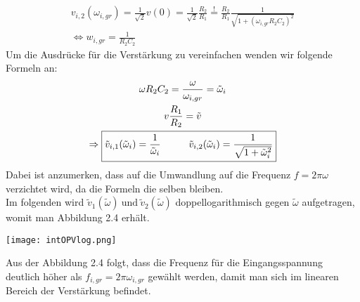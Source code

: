 \begin{gather}
    v_{i,2}(\omega_{i,gr}) = \frac{1}{\sqrt{2}} v(0) = \frac{1}{\sqrt{2}} \frac{R_2}{R_1} \overset{!}{=} \frac{R_2}{R_1} \frac{1}{\sqrt{1+(\omega_{i,gr} R_2 C_2)^2}}\\
    \Leftrightarrow \boxed{w_{i,gr} = \frac{1}{R_2 C_2}}
\end{gather}
Um die Ausdrücke für die Verstärkung zu vereinfachen wenden wir folgende Formeln an:
\begin{gather}
    \omega R_2 C_2 = \frac{\omega}{\omega_{i,gr}} = \tilde{\omega}_i\\
    v\frac{R_1}{R_2}=\tilde{v}\\
    \Rightarrow \boxed{\tilde{v}_{i,1}(\tilde{\omega}_i) = \frac{1}{\tilde{\omega}_i} \hspace*{1cm} \tilde{v}_{i,2}(\tilde{\omega}_i) =\frac{1}{\sqrt{1+\tilde{\omega}_i^2}}}
\end{gather}
Dabei ist anzumerken, dass auf die Umwandlung auf die Frequenz $f=2\pi\omega$ verzichtet wird, da die Formeln die selben bleiben.\\
Im folgenden wird $\tilde{v}_1(\tilde{\omega})~\text{und}~\tilde{v}_{2}(\tilde{\omega})$ doppellogarithmisch gegen $\tilde{\omega}$ aufgetragen, womit man Abbildung 2.4 erhält.
\begin{center}
    \texttt{[image: intOPVlog.png]}
\end{center}
Aus der Abbildung 2.4 folgt, dass die Frequenz für die Eingangsspannung deutlich höher als $f_{i,gr}=2\pi\omega_{i,gr}$ gewählt werden, damit man sich im linearen Bereich der Verstärkung befindet.

